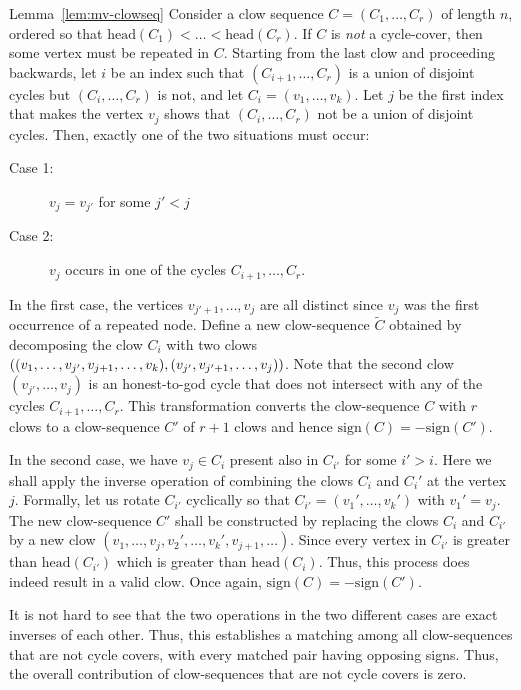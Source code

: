 \begin{proofof}{Lemma~\ref{lem:mv-clowseq}}
Consider a clow sequence $C = (C_1,\dots, C_r)$ of length $n$, ordered so that $\mathrm{head}(C_1) < \dots < \mathrm{head}(C_r)$. If $C$ is \emph{not} a cycle-cover, then some vertex must be repeated in $C$. Starting from the last clow and proceeding backwards, let $i$ be an index such that $(C_{i+1},\dots, C_{r})$ is a union of disjoint cycles but $(C_{i},\dots, C_r)$ is not, and let $C_i = (v_1,\dots, v_k)$. Let $j$ be the first index that makes the vertex $v_{j}$ shows that $(C_i,\dots, C_r)$ not be a union of disjoint cycles. Then, exactly one of the two situations must occur:
\begin{description}
 \item[Case 1:] $v_{j} = v_{j'}$ for some $j' < j$

 \item[Case 2:] $v_{j}$ occurs in one of the cycles $C_{i+1},\dots, C_r$. 
\end{description}

In the first case, the vertices $v_{j'+1},\dots, v_{j}$ are all distinct since $v_j$ was the first occurrence of a repeated node. Define a new clow-sequence  $\tilde{C}$ obtained by decomposing the clow $C_i$ with two clows $\left((v_1,\dots, v_{j'},v_{j+1},\dots, v_k), (v_{j'},v_{j'+1},\dots,v_{j})\right)$. Note that the second clow $(v_{j'},\dots, v_j)$ is an honest-to-god cycle that does not intersect with any of the cycles $C_{i+1},\dots, C_r$. This transformation converts the clow-sequence $C$ with $r$ clows to a clow-sequence $C'$ of $r+1$ clows and hence $\mathrm{sign}(C) = - \mathrm{sign}(C')$. 

In the second case, we have $v_j \in C_i$ present also in $C_{i'}$ for some $i' > i$. Here we shall apply the inverse operation of combining the clows $C_i$ and $C_i'$ at the vertex $j$. Formally, let us rotate $C_{i'}$ cyclically so that $C_{i'} = (v_1',\dots, v_k')$ with $v_1' = v_j$. The new clow-sequence $C'$ shall be constructed by replacing the clows $C_i$ and $C_{i'}$ by a new clow $(v_1,\dots, v_j, v_2',\dots, v_k', v_{j+1},\dots)$. Since every vertex in $C_{i'}$ is greater than $\mathrm{head}(C_{i'})$ which is greater than $\mathrm{head}(C_i)$. Thus, this process does indeed result in a valid clow. Once again, $\mathrm{sign}(C) = - \mathrm{sign}(C')$.\\


It is not hard to see that the two operations in the two different cases are exact inverses of each other. Thus, this establishes a matching among all clow-sequences that are not cycle covers, with every matched pair having opposing signs. Thus, the overall contribution of clow-sequences that are not cycle covers is zero. 
\end{proofof}




